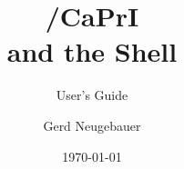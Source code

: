 \pagestyle{ulheadings}

\setlength{\headheight}{3ex}
\setlength{\parindent}{0Em}
\setlength{\parskip}{1ex}

\author{Gerd Neugebauer}
\title{   \ProCom/CaPrI
        \\and the Shell \ProTop}
\subtitle{User's Guide}
\version{\Version}
\edition{\RCSrevision}
\date{\today}
\address{Fachbereich Informatik, Mathematik und Naturwissnschaft
\\	 Hochschule f{\"u}r Technik, Wirtschaft und Kultur, Leipzig
\\       Postfach 66
\\       04251 Leipzig (Germany)
\\       Net: gerd@imn.th-leipzig.de
}


\newenvironment{Sample}{%
        \begin{center}
          \begin{minipage}{.5\textwidth}
            \rule{\textwidth}{.1pt}\vspace{-1ex}%
            }{%
            \vspace{-2ex}\rule{\textwidth}{.1pt}
          \end{minipage}
        \end{center}%
        }

\let\PrologFILE=\relax
\let\PredicateFileExtension=\relax

